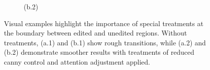 \documentclass{article}
\begin{document}
\begin{figure}[htbp]
\begin{subfigure}[b]{0.2\textwidth}
        \caption*{(b.2)}
    \end{subfigure}
    \caption{Visual examples highlight the importance of special treatments at the boundary between edited and unedited regions. Without treatments, (a.1) and (b.1) show rough transitions, while (a.2) and (b.2) demonstrate smoother results with treatments of reduced canny control and attention adjustment applied.}
    \label{fig:treaments}
\end{figure}


\end{document}
